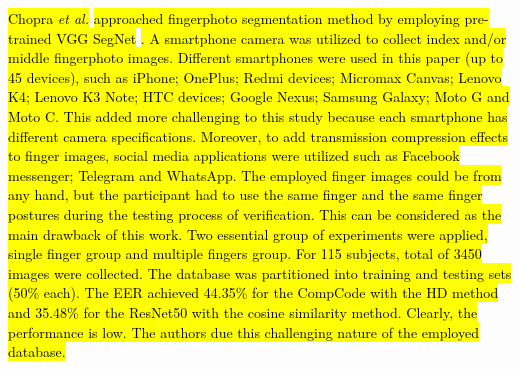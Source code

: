 \documentclass[review]{elsarticle}
\begin{document}
	\hl{Chopra \textit{et al.}} \cite{Chopra2018Unconstrained} \hl{approached fingerphoto segmentation method by employing pre-trained VGG SegNet} \cite{Badrinarayanan2017SegNet}\hl{. A smartphone camera was utilized to collect index and/or middle fingerphoto images. Different smartphones were used in this paper (up to 45 devices), such as iPhone; OnePlus; Redmi devices; Micromax	Canvas; Lenovo K4; Lenovo K3 Note; HTC devices; Google Nexus; Samsung	Galaxy; Moto G and Moto C. This added more challenging to this study because each smartphone has different camera specifications. Moreover, to add transmission compression effects to finger images, social media applications were utilized such as Facebook messenger; Telegram  and WhatsApp.
	The employed finger images could be from any hand, but the participant had to use the same finger and the same finger postures during the testing process of verification. This can be considered as the main drawback of this work. Two essential group of experiments were applied, single finger group and multiple fingers group. For 115 subjects, total of 3450 images were collected. The database was partitioned into training and testing sets (50\% each). The EER achieved 44.35\% for the CompCode with the HD method and 35.48\% for the ResNet50 with the cosine similarity method. Clearly, the performance is low. The authors due this challenging nature of the employed database.}
\end{document}
